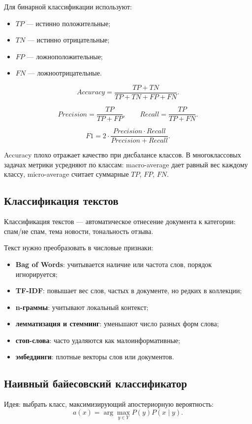 Для бинарной классификации используют:
\begin{itemize}
    \item $TP$ --- истинно положительные;
    \item $TN$ --- истинно отрицательные;
    \item $FP$ --- ложноположительные;
    \item $FN$ --- ложноотрицательные.
\end{itemize}

\[
Accuracy=\frac{TP+TN}{TP+TN+FP+FN}.
\]

\[
Precision=\frac{TP}{TP+FP},\qquad Recall=\frac{TP}{TP+FN}.
\]

\[
F1=2\cdot\frac{Precision\cdot Recall}{Precision+Recall}.
\]

Accuracy плохо отражает качество при дисбалансе классов. В многоклассовых задачах метрики усредняют по классам: macro-average дает равный вес каждому классу, micro-average считает суммарные $TP$, $FP$, $FN$.

\subsection*{Классификация текстов}

Классификация текстов --- автоматическое отнесение документа к категории: спам/не спам, тема новости, тональность отзыва.

Текст нужно преобразовать в числовые признаки:
\begin{itemize}
    \item \textbf{Bag of Words}: учитывается наличие или частота слов, порядок игнорируется;
    \item \textbf{TF-IDF}: повышает вес слов, частых в документе, но редких в коллекции;
    \item \textbf{n-граммы}: учитывают локальный контекст;
    \item \textbf{лемматизация и стемминг}: уменьшают число разных форм слова;
    \item \textbf{стоп-слова}: часто удаляются как малоинформативные;
    \item \textbf{эмбеддинги}: плотные векторы слов или документов.
\end{itemize}

\subsection*{Наивный байесовский классификатор}

Идея: выбрать класс, максимизирующий апостериорную вероятность:
\[
a(x)=\arg\max_{y\in Y}P(y)P(x\mid y).
\]

